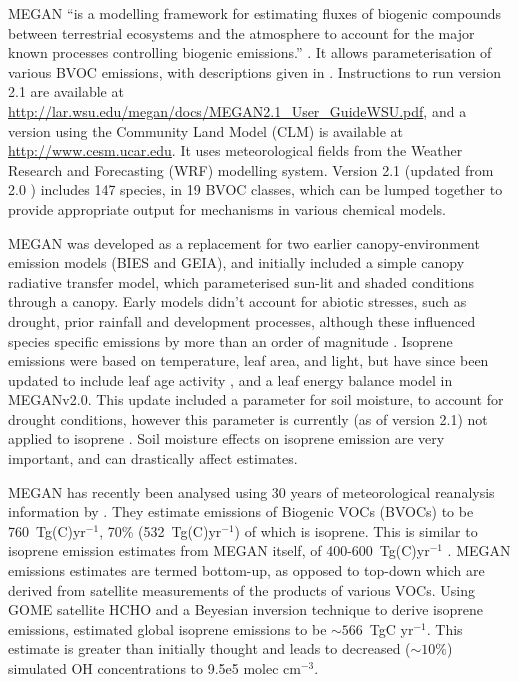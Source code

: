       MEGAN ``is a modelling framework for estimating fluxes of biogenic compounds between terrestrial ecosystems and the atmosphere to account for the major known processes controlling biogenic emissions.'' \citep{Guenther2012}.
      It allows parameterisation of various BVOC emissions, with descriptions given in \cite{Guenther2012}.
      Instructions to run version 2.1 are available at \url{http://lar.wsu.edu/megan/docs/MEGAN2.1_User_GuideWSU.pdf}, and a version using the Community Land Model (CLM) is available at \url{http://www.cesm.ucar.edu}.
      It uses meteorological fields from the Weather Research and Forecasting (WRF) modelling system.
      Version 2.1 (updated from 2.0 \citep{Guenther2006}) includes 147 species, in 19 BVOC classes, which can be lumped together to provide appropriate output for mechanisms in various chemical models.
      
      MEGAN was developed as a replacement for two earlier canopy-environment emission models (BIES and GEIA), and initially included a simple canopy radiative transfer model, which parameterised sun-lit and shaded conditions through a canopy.
      Early models didn't account for abiotic stresses, such as drought, prior rainfall and development processes, although these influenced species specific emissions by more than an order of magnitude \citep{Niinemets1999}.
      Isoprene emissions were based on temperature, leaf area, and light, but have since been updated to include leaf age activity \citep{Guenther2000}, and a leaf energy balance model \citep{Guenther2006} in MEGANv2.0.
      This update included a parameter for soil moisture, to account for drought conditions, however this parameter is currently (as of version 2.1) not applied to isoprene \citep{Sindelarova2014}.
      Soil moisture effects on isoprene emission are very important, and can drastically affect estimates.
      
      MEGAN has recently been analysed using 30 years of meteorological reanalysis information by \cite{Sindelarova2014}.
      They estimate emissions of Biogenic VOCs (BVOCs) to be 760~Tg(C)yr$^{-1}$, 70\% (532~Tg(C)yr$^{-1}$) of which is isoprene.
      This is similar to isoprene emission estimates from MEGAN itself, of 400-600~Tg(C)yr$^{-1}$ \citep{Guenther2006}.
      MEGAN emissions estimates are termed bottom-up, as opposed to top-down which are derived from satellite measurements of the products of various VOCs.
      Using GOME satellite HCHO and a Beyesian inversion technique to derive isoprene emissions, \cite{Shim2005} estimated global isoprene emissions to be $\sim566$~TgC yr$^{-1}$. 
      This estimate is greater than initially thought and leads to decreased ($\sim10\%$) simulated OH concentrations to 9.5e5 molec cm$^{-3}$.
      
